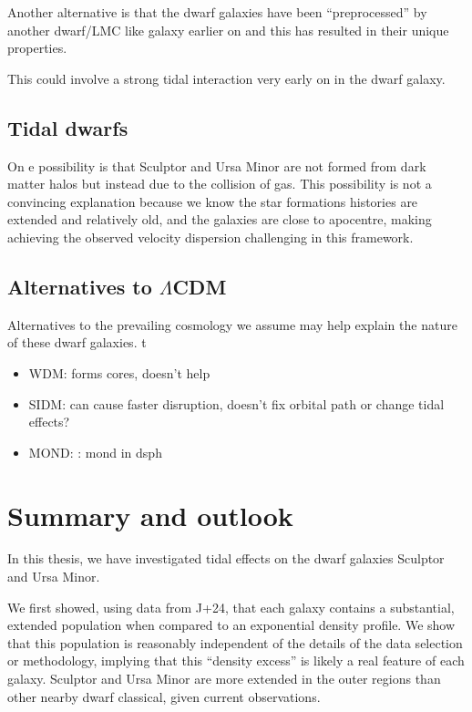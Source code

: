 Another alternative is that the dwarf galaxies have been
``preprocessed'' by another dwarf/LMC like galaxy earlier on and this
has resulted in their unique properties.

This could involve a strong tidal interaction very early on in the dwarf
galaxy.

\subsection{Tidal dwarfs}\label{tidal-dwarfs}

On e possibility is that Sculptor and Ursa Minor are not formed from
dark matter halos but instead due to the collision of gas. This
possibility is not a convincing explanation because we know the star
formations histories are extended and relatively old, and the galaxies
are close to apocentre, making achieving the observed velocity
dispersion challenging in this framework.

\subsection{\texorpdfstring{Alternatives to
\(\Lambda\)CDM}{Alternatives to \textbackslash LambdaCDM}}\label{alternatives-to-lambdacdm}

Alternatives to the prevailing cosmology we assume may help explain the
nature of these dwarf galaxies. t

\begin{itemize}
\tightlist
\item
  WDM: forms cores, doesn't help
\item
  SIDM: can cause faster disruption, doesn't fix orbital path or change
  tidal effects?
\item
  MOND: \citet{sanchez-salcedo+hernandez2007}: mond in dsph
\end{itemize}

\section{Summary and outlook}\label{summary-and-outlook}

In this thesis, we have investigated tidal effects on the dwarf galaxies
Sculptor and Ursa Minor.

We first showed, using data from J+24, that each galaxy contains a
substantial, extended population when compared to an exponential density
profile. We show that this population is reasonably independent of the
details of the data selection or methodology, implying that this
``density excess'' is likely a real feature of each galaxy. Sculptor and
Ursa Minor are more extended in the outer regions than other nearby
dwarf classical, given current observations.

